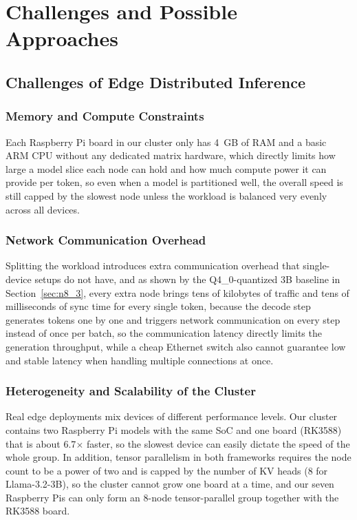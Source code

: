 \documentclass[11pt,a4paper]{article}
\begin{document}
\section{Challenges and Possible Approaches}\label{sec:n5}

\subsection{Challenges of Edge Distributed Inference}\label{sec:n5_1}

\subsubsection{Memory and Compute Constraints}\label{sec:n5_1_1}
Each Raspberry Pi board in our cluster only has 4~GB of RAM and a basic ARM CPU without any dedicated matrix hardware, which directly limits how large a model slice each node can hold and how much compute power it can provide per token, so even when a model is partitioned well, the overall speed is still capped by the slowest node unless the workload is balanced very evenly across all devices.

\subsubsection{Network Communication Overhead}\label{sec:n5_1_2}
Splitting the workload introduces extra communication overhead that single-device setups do not have, and as shown by the Q4\_0-quantized 3B baseline in Section~\ref{sec:n8_3}, every extra node brings tens of kilobytes of traffic and tens of milliseconds of sync time for every single token, because the decode step generates tokens one by one and triggers network communication on every step instead of once per batch, so the communication latency directly limits the generation throughput, while a cheap Ethernet switch also cannot guarantee low and stable latency when handling multiple connections at once.

\subsubsection{Heterogeneity and Scalability of the Cluster}\label{sec:n5_1_3}
Real edge deployments mix devices of different performance levels. Our cluster contains two Raspberry Pi models with the same SoC and one board (RK3588) that is about 6.7$\times$ faster, so the slowest device can easily dictate the speed of the whole group. In addition, tensor parallelism in both frameworks requires the node count to be a power of two and is capped by the number of KV heads (8 for Llama-3.2-3B), so the cluster cannot grow one board at a time, and our seven Raspberry Pis can only form an 8-node tensor-parallel group together with the RK3588 board.
\end{document}
